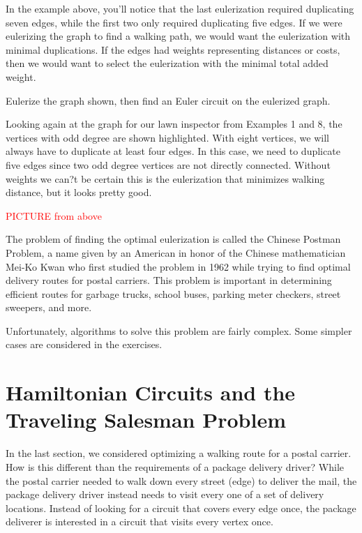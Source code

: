 In the example above, you'll notice that the last eulerization required duplicating seven edges, while the first two only required duplicating five edges.  If we were eulerizing the graph to find a walking path, we would want the eulerization with minimal duplications.  If the edges had weights representing distances or costs, then we would want to select the eulerization with the minimal total added weight.


\begin{exercise}{}{} %
Eulerize the graph shown, then find an Euler circuit on the eulerized graph.\\
\end{exercise}


\begin{example}{}{}%
Looking again at the graph for our lawn inspector from Examples 1 and 8, the vertices with odd degree are shown highlighted.  With eight vertices, we will always have to duplicate at least four edges.  In this case, we need to duplicate five edges since two odd degree vertices are not directly connected.  Without weights we can?t be certain this is the eulerization that minimizes walking distance, but it looks pretty good.

\textcolor{red}{PICTURE from above}
\end{example}


The problem of finding the optimal eulerization is called the Chinese Postman Problem, a name given by an American in honor of the Chinese mathematician Mei-Ko Kwan who first studied the problem in 1962 while trying to find optimal delivery routes for postal carriers.   This problem is important in determining efficient routes for garbage trucks, school buses, parking meter checkers, street sweepers, and more.

Unfortunately, algorithms to solve this problem are fairly complex.  Some simpler cases are considered in the exercises.

\section{Hamiltonian Circuits and the Traveling Salesman Problem}
In the last section, we considered optimizing a walking route for a postal carrier.  How is this different than the requirements of a package delivery driver?  While the postal carrier needed to walk down every street (edge) to deliver the mail, the package delivery driver instead needs to visit every one of a set of delivery locations.  Instead of looking for a circuit that covers every edge once, the package deliverer is interested in a circuit that visits every vertex once.


